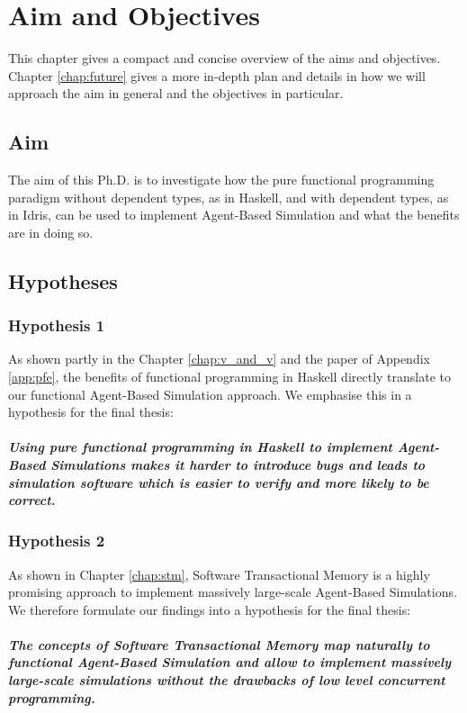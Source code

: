 \chapter{Aim and Objectives}
\label{chap:aimsObj}

This chapter gives a compact and concise overview of the aims and objectives. Chapter \ref{chap:future} gives a more in-depth plan and details in how we will approach the aim in general and the objectives in particular.

\section{Aim}
The aim of this Ph.D. is to investigate how the pure functional programming paradigm without dependent types, as in Haskell, and with dependent types, as in Idris, can be used to implement Agent-Based Simulation and what the benefits are in doing so.

\section{Hypotheses}
\subsection{Hypothesis 1}
As shown partly in the Chapter \ref{chap:v_and_v} and the paper of Appendix \ref{app:pfe}, the benefits of functional programming in Haskell directly translate to our functional Agent-Based Simulation approach. We emphasise this in a hypothesis for the final thesis:

\paragraph{Using pure functional programming in Haskell to implement Agent-Based Simulations makes it harder to introduce bugs and leads to simulation software which is easier to verify and more likely to be correct.}

\subsection{Hypothesis 2}
As shown in Chapter \ref{chap:stm}, Software Transactional Memory is a highly promising approach to implement massively large-scale Agent-Based Simulations. We therefore formulate our findings into a hypothesis for the final thesis:

\paragraph{The concepts of Software Transactional Memory map naturally to functional Agent-Based Simulation and allow to implement massively large-scale simulations without the drawbacks of low level concurrent programming.}

